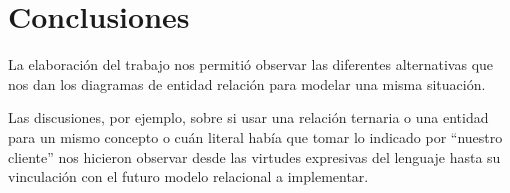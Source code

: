 \section{Conclusiones}

La elaboración del trabajo nos permitió observar las diferentes alternativas que nos dan los diagramas de entidad relación para modelar una misma situación.

Las discusiones, por ejemplo, sobre si usar una relación ternaria o una entidad para un mismo concepto o cuán literal había que tomar lo indicado por ``nuestro cliente'' nos hicieron observar desde las virtudes expresivas del lenguaje hasta su vinculación con el futuro modelo relacional a implementar.

